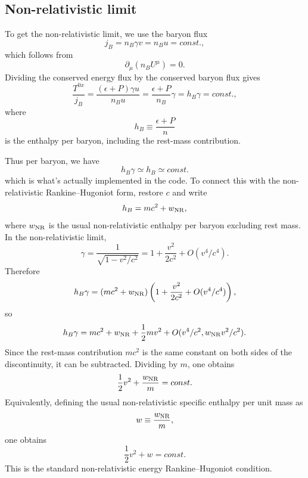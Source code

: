 \documentclass[11pt]{article}
\begin{document}
\subsection{Non-relativistic limit}
To get the non-relativistic limit, we use the baryon flux
\begin{equation}
j_B=n_B\gamma v = n_Bu =const.,
\end{equation}
which follows from
\begin{equation}
\partial_\mu(n_B U^\mu)=0.
\end{equation}
Dividing the conserved energy flux by the conserved baryon flux gives
\begin{equation}
\frac{T^{0x}}{j_B}
=
\frac{(\epsilon+P)\gamma u}{n_B u}
=
\frac{\epsilon+P}{n_B}\gamma
=
h_B\gamma
=
const.,
\end{equation}
where
\begin{equation}
h_B\equiv\frac{\epsilon+P}{n}
\end{equation}
is the enthalpy per baryon, including the rest-mass contribution. 

Thus per baryon, we have
\begin{equation}
h_B\gamma\simeq h_B\simeq const.
\end{equation}
which is what's actually implemented in the code.
To connect this with the non-relativistic Rankine--Hugoniot form, restore \(c\) and write
\begin{equation}
h_B=mc^2+w_{\rm NR},
\end{equation}
where \(w_{\rm NR}\) is the usual non-relativistic enthalpy per baryon excluding rest mass. In the non-relativistic limit,
\begin{equation}
\gamma=\frac{1}{\sqrt{1-v^2/c^2}}
=
1+\frac{v^2}{2c^2}
+O(v^4/c^4).
\end{equation}
Therefore
\begin{equation}
h_B\gamma
=
(mc^2+w_{\rm NR})
\left(
1+\frac{v^2}{2c^2}
+O(v^4/c^4)
\right),
\end{equation}
so
\begin{equation}
h_B\gamma
=
mc^2+w_{\rm NR}
+\frac{1}{2}mv^2
+O(v^4/c^2,w_{\rm NR}v^2/c^2).
\end{equation}
Since the rest-mass contribution \(mc^2\) is the same constant on both sides of the discontinuity, it can be subtracted. Dividing by \(m\), one obtains
\begin{equation}
\frac{1}{2}v^2+\frac{w_{\rm NR}}{m}
=
const.
\end{equation}
Equivalently, defining the usual non-relativistic specific enthalpy per unit mass as
\begin{equation}
w\equiv\frac{w_{\rm NR}}{m},
\end{equation}
one obtains
\begin{equation}
\boxed{
\frac{1}{2}v^2+w=const.
}
\end{equation}
This is the standard non-relativistic energy Rankine--Hugoniot condition.
\end{document}
